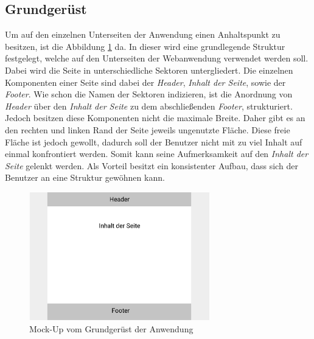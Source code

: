 \subsection{Grundgerüst}

Um auf den einzelnen Unterseiten der Anwendung einen Anhaltspunkt zu besitzen, ist die Abbildung \ref{fig:MockGrundgeruest} da. 
In dieser wird eine grundlegende Struktur festgelegt, welche auf den Unterseiten der Webanwendung verwendet werden soll.
Dabei wird die Seite in unterschiedliche Sektoren untergliedert.
Die einzelnen Komponenten einer Seite sind dabei der \emph{Header}, \emph{Inhalt der Seite}, sowie der \emph{Footer}. 
Wie schon die Namen der Sektoren indizieren, ist die Anordnung von \emph{Header} über den \emph{Inhalt der Seite} zu dem abschließenden \emph{Footer}, strukturiert.
Jedoch besitzen diese Komponenten nicht die maximale Breite.
Daher gibt es an den rechten und linken Rand der Seite jeweils ungenutzte Fläche. 
Diese freie Fläche ist jedoch gewollt, dadurch soll der Benutzer nicht mit zu viel Inhalt auf einmal konfrontiert werden.
Somit kann seine Aufmerksamkeit auf den \emph{Inhalt der Seite} gelenkt werden.
Als Vorteil besitzt ein konsistenter Aufbau, dass sich der Benutzer an eine Struktur gewöhnen kann. 

\begin{figure}[h]
	\centering
	\includegraphics[width=0.7\textwidth]{img/konzeption/client/grundgeruest}
	\captionsetup{justification=centering, format=plain}
	\caption[Mock-Up vom Grundgerüst der Anwendung]{Mock-Up vom Grundgerüst der Anwendung \\\figma}
	\label{fig:MockGrundgeruest}
\end{figure}
